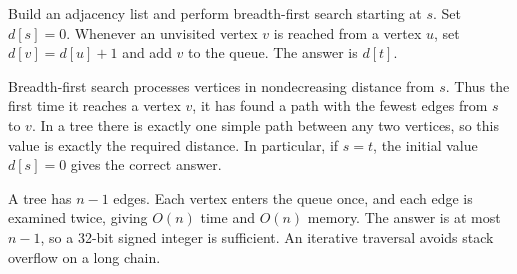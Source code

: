 Build an adjacency list and perform breadth-first search starting at $s$. Set $d[s]=0$. Whenever an unvisited vertex $v$ is reached from a vertex $u$, set $d[v]=d[u]+1$ and add $v$ to the queue. The answer is $d[t]$.

Breadth-first search processes vertices in nondecreasing distance from $s$. Thus the first time it reaches a vertex $v$, it has found a path with the fewest edges from $s$ to $v$. In a tree there is exactly one simple path between any two vertices, so this value is exactly the required distance. In particular, if $s=t$, the initial value $d[s]=0$ gives the correct answer.

A tree has $n-1$ edges. Each vertex enters the queue once, and each edge is examined twice, giving $O(n)$ time and $O(n)$ memory. The answer is at most $n-1$, so a 32-bit signed integer is sufficient. An iterative traversal avoids stack overflow on a long chain.
